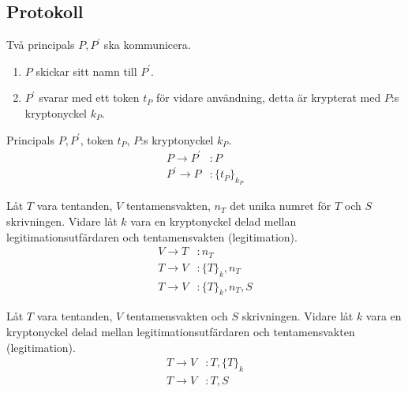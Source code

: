 \documentclass{beamer}
\theoremstyle{definition}
\theoremstyle{remark}
\begin{document}
\subsection{Protokoll}

\begin{frame}
  \begin{example}[Protokollbeskrivning]
    Två principals \(P, P^\prime\) ska kommunicera.
    \begin{enumerate}
      \item \(P\) skickar sitt namn till \(P^\prime\).
      \item \(P^\prime\) svarar med ett token \(t_P\) för vidare användning, 
        detta är krypterat med \(P\):s kryptonyckel \(k_P\).
    \end{enumerate}
  \end{example}

  \pause{}

  \begin{example}
    Principals \(P, P^\prime\), token \(t_P\), \(P\):s kryptonyckel \(k_P\).
    \begin{align*}
      P\to P^\prime&\colon P \\
      P^\prime\to P&\colon \{t_P\}_{k_P}
    \end{align*}
  \end{example}
\end{frame}

\begin{frame}
  \begin{example}
    Låt \(T\) vara tentanden, \(V\) tentamensvakten, \(n_T\) det unika numret 
    för \(T\) och \(S\) skrivningen.
    Vidare låt \(k\) vara en kryptonyckel delad mellan legitimationsutfärdaren 
    och tentamensvakten (legitimation).
    \begin{align*}
      V\to T&\colon n_T \\
      T\to V&\colon \{T\}_k, n_T \\
      T\to V&\colon \{T\}_k, n_T, S
    \end{align*}
  \end{example}
\end{frame}

\begin{frame}
  \begin{example}
    Låt \(T\) vara tentanden, \(V\) tentamensvakten och \(S\) skrivningen.
    Vidare låt \(k\) vara en kryptonyckel delad mellan legitimationsutfärdaren 
    och tentamensvakten (legitimation).
    \begin{align*}
      T\to V&\colon T, \{T\}_k \\
      T\to V&\colon T, S
    \end{align*}
  \end{example}
\end{frame}
\end{document}
